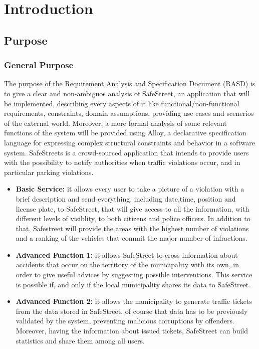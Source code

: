 \documentclass[../RASD.tex]{subfiles}
\begin{document}
    \chapter{Introduction}\label{ch:introduction}
    \section{Purpose}\label{sec:purpose}
    \subsection{General Purpose}\label{subsec:general-purpose}
    The purpose of the Requirement Analysis and Specification Document (RASD) is to give a clear and non-ambiguos analysis of SafeStreet, an application that will be implemented, describing every aspects of it like functional/non-functional requirements, constraints, domain assumptions, providing use cases and scenerios of the external world. Moreover, a more formal analysis of some relevant functions of the system will be provided using Alloy, a declarative specification language for expressing complex structural constraints and behavior in a software system.
    SafeStreets is a crowd-sourced application that intends to provide users with the possibility to notify authorities when traffic violations occur, and in particular parking violations.
    \begin{itemize}
        \item \textbf{Basic Service:}
        it allows every user to take a picture of a violation with a brief description and send everything, including date,time, position and license plate, to SafeStreet, that will give access to all the information, with different levels of visiblity, to both citizens and police officers. In addition to that, Safestreet will provide the areas with the highest number of violations and a ranking of the vehicles that commit the major number of infractions.
        \item \textbf{Advanced Function 1:}
        it allows SafeStreet to cross information about accidents that occur on the territory of the municipality with its own, in order to give useful advices by suggesting possible interventions. This service is possible if, and only if the local municipality shares its data to SafeStreet.
        \item \textbf{Advanced Function 2:}
        it allows the municipality to generate traffic tickets from the data stored in SafeStreet, of course that data has to be previously validated by the system, preventing malicious corruptions by offenders. Moreover, having the information about issued tickets, SafeStreet can build statistics and share them among all users.
    \end{itemize}
\end{document}
